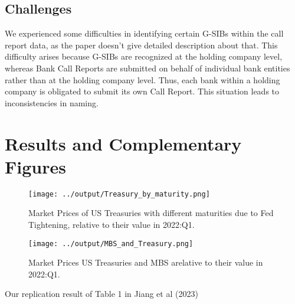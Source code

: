 \documentclass{article}
\begin{document}
\subsection{Challenges}

We experienced some difficulties in identifying certain G-SIBs within the call report data, as the paper doesn't give detailed description about that. This difficulty arises because G-SIBs are recognized at the holding company level, whereas Bank Call Reports are submitted on behalf of individual bank entities rather than at the holding company level. Thus, each bank within a holding company is obligated to submit its own Call Report. This situation leads to inconsistencies in naming.

\section{Results and Complementary Figures}


\begin{figure}[h]
\centering
\texttt{[image: ../output/Treasury\_by\_maturity.png]}
\caption{\label{fig:myplot}Market Prices of US Treasuries with different maturities due to Fed Tightening, relative to their value in 2022:Q1.}
\end{figure}

\begin{figure}[h]
\centering
\texttt{[image: ../output/MBS\_and\_Treasury.png]}
\caption{\label{fig:myplot}Market Prices US Treasuries and MBS arelative to their value in 2022:Q1.}
\end{figure}



\begin{table}

\centering

\caption{Our replication result of Table 1 in Jiang et al (2023)}
\label{table:Table1.tex}
\end{table}
\end{document}
